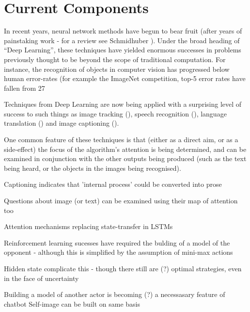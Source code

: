 \documentclass[citeauthoryear]{llncs}
\begin{document}


\section{Current Components}

In recent years, neural network methods have begun to bear fruit (after years
of painstaking work - for a review see Schmidhuber \cite{SchmidhuberOverview}).
%
Under the broad heading of ``Deep Learning'', these techniques have yielded 
enormous successes in problems previously thought to be beyond the scope of traditional computation.
%
For instance, the recognition of objects in computer vision 
has progressed below human error-rates (for example the ImageNet competition, top-5 error rates
have fallen from 27%

Techniques from Deep Learning are now being applied with a surprising 
level of success to such things as 
image tracking (\cite{VisualAttention}), 
speech recognition (\cite{SpeechAttention}), 
language translation (\cite{TranslationAttention}) 
and image captioning (\cite{ImageCaptioning}).

One common feature of these techniques is that (either as a direct aim, or as a side-effect)
the focus of the algorithm's attention is being determined, and can be examined in 
conjunction with the other outputs being produced (such as the text being heard, or the 
objects in the images being recognised).



Captioning indicates that 'internal process' could be converted into prose

Questions about image (or text) can be examined using their map of attention too

Attention mechanisms replacing state-transfer in LSTMs


Reinforcement learning sucesses have required the bulding of a model
of the opponent - although this is simplified by the assumption of mini-max actions

  Hidden state complicate this - though there still are (?) optimal strategies, even in the face of uncertainty


Building a model of another actor is becoming (?) a necessasary feature of chatbot 
Self-image can be built on same basis
\end{document}
